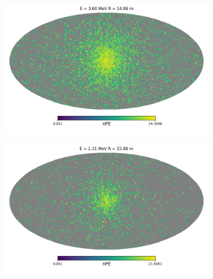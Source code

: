 \documentclass[../main.tex]{subfiles}
\begin{document}
\begin{figure}
  \begin{subfigure}[t]{0.48\linewidth}
    \includegraphics[width=\linewidth]{images/jgnn/harmonic/event_idx_600.png}
    \caption{}
  \end{subfigure}
  \hfill
  \begin{subfigure}[t]{0.48\linewidth}
    \includegraphics[width=\linewidth]{images/jgnn/harmonic/event_idx_700.png}
    \caption{}
  \end{subfigure}




\end{figure}
\end{document}
